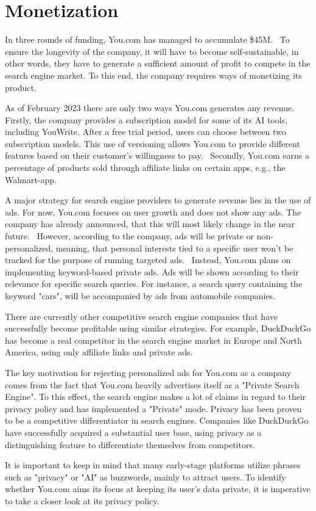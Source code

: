 \documentclass[5p,twocolumn,final]{elsarticle}
\begin{document}
\section{Monetization}
In three rounds of funding, You.com has managed to accumulate \$45M.~\cite{crunchbase} To ensure the longevity of the company, it will have to become self-sustainable, in other words, they have to generate a sufficient amount of profit to compete in the search engine market.
To this end, the company requires ways of monetizing its product.\par
As of February 2023 there are only two ways You.com generates any revenue. Firstly, the company provides a subscription model for some of its AI tools, including YouWrite. After a free trial period, users can choose between two subscription models. This use of versioning allows You.com to provide different features based on their customer's willingness to pay.~\cite{linde2009pricing}
Secondly, You.com earns a percentage of products sold through affiliate links on certain apps, e.g., the Walmart-app.~\cite{youcom_ai}\par
A major strategy for search engine providers to generate revenue lies in the use of ads. For now, You.com focuses on user growth and does not show any ads. The company has already announced, that this will most likely change in the near future.~\cite{youcom_ai} However, according to the company, ads will be private or non-personalized, meaning, that personal interests tied to a specific user won't be tracked for the purpose of running targeted ads.~\cite{farahat2012} Instead, You.com plans on implementing keyword-based private ads. Ads will be shown according to their relevance for specific search queries. For instance, a search query containing the keyword "cars", will be accompanied by ads from automobile companies. \par
There are currently other competitive search engine companies that have successfully become profitable using similar strategies. For example, DuckDuckGo has become a real competitor in the search engine market in Europe and North America, using only affiliate links and private ads.~\cite{thinkinsights} \par
The key motivation for rejecting personalized ads for You.com as a company comes from the fact that You.com heavily advertises itself as a "Private Search Engine". To this effect, the search engine makes a lot of claims in regard to their privacy policy and has implemented a "Private" mode.
Privacy has been proven to be a competitive differentiator in search engines. Companies like DuckDuckGo have successfully acquired a substantial user base, using privacy as a distinguishing feature to differentiate themselves from competitors.\par
It is important to keep in mind that many early-stage platforms utilize phrases such as "privacy" or "AI" as buzzwords, mainly to attract users. To identify whether You.com aims its focus at keeping its user's data private, it is imperative to take a closer look at its privacy policy.
\end{document}
